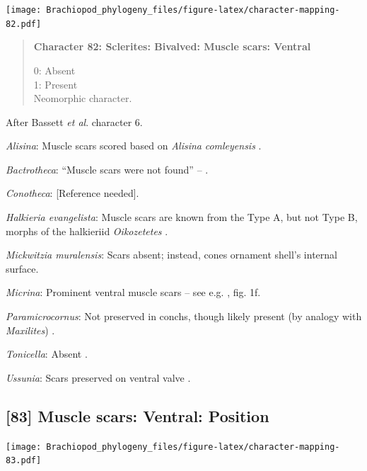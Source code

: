 \documentclass[openany]{book}
\begin{document}
\texttt{[image: Brachiopod\_phylogeny\_files/figure-latex/character-mapping-82.pdf]}

\begin{quote}
\textbf{Character 82: Sclerites: Bivalved: Muscle scars: Ventral }

0: Absent\\
1: Present\\
Neomorphic character.
\end{quote}

After Bassett \emph{et al}.
\citeyearpar{Bassett2001Functionalmorphology} character 6.

\hypertarget{Alisina-coding-82}{}
\emph{Alisina}: Muscle scars scored based on \emph{Alisina}
\emph{comleyensis} \citep{Bassett2001Functionalmorphology}.

\hypertarget{Bactrotheca-coding-82}{}
\emph{Bactrotheca}: ``Muscle scars were not found'' --
\citet{Valent2012}.

\hypertarget{Conotheca-coding-82}{}
\emph{Conotheca}: {[}Reference needed{]}.

\hypertarget{Halkieria_evangelista-coding-82}{}
\emph{Halkieria evangelista}: Muscle scars are known from the Type A,
but not Type B, morphs of the halkieriid \emph{Oikozetetes}
\citep{Paterson2009, Jacquet2014}.

\hypertarget{Mickwitzia_muralensis-coding-82}{}
\emph{Mickwitzia muralensis}: Scars absent; instead, cones ornament
shell's internal surface.

\hypertarget{Micrina-coding-82}{}
\emph{Micrina}: Prominent ventral muscle scars -- see e.g.
\citet{Holmer2008TheEarly}, fig. 1f.

\hypertarget{Paramicrocornus-coding-82}{}
\emph{Paramicrocornus}: Not preserved in conchs, though likely present
(by analogy with \emph{Maxilites}) \citep{Zhang2018Ahyolithid}.

\hypertarget{Tonicella-coding-82}{}
\emph{Tonicella}: Absent \citep{Schwabe2010}.

\hypertarget{Ussunia-coding-82}{}
\emph{Ussunia}: Scars preserved on ventral valve \citep{Nikitin1984}.

\subsection*{{[}83{]} Muscle scars: Ventral:
Position}\label{muscle-scars-ventral-position}

\texttt{[image: Brachiopod\_phylogeny\_files/figure-latex/character-mapping-83.pdf]}
\end{document}
